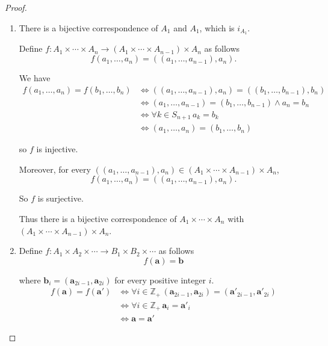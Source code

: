 \begin{proof}
    \begin{enumerate}[label={(\alph*)}]
        \item There is a bijective correspondence of $A_{1}$ and $A_{1}$, which is $i_{A_{1}}$.

              Define $f: A_{1}\times \cdots \times A_{n} \to (A_{1}\times \cdots \times A_{n-1}) \times A_{n}$ as follows
              \[
                  f(a_{1}, \ldots, a_{n}) = ((a_{1}, \ldots, a_{n-1}), a_{n}).
              \]

              We have
              \begin{align*}
                  f(a_{1}, \ldots, a_{n}) = f(b_{1}, \ldots, b_{n}) & \Longleftrightarrow ((a_{1}, \ldots, a_{n-1}), a_{n}) = ((b_{1}, \ldots, b_{n-1}), b_{n})   \\
                                                                    & \Longleftrightarrow (a_{1}, \ldots, a_{n-1}) = (b_{1}, \ldots, b_{n-1}) \land a_{n} = b_{n} \\
                                                                    & \Longleftrightarrow \forall k\in S_{n+1}\, a_{k} = b_{k}                                    \\
                                                                    & \Longleftrightarrow (a_{1}, \ldots, a_{n}) = (b_{1}, \ldots, b_{n})
              \end{align*}

              so $f$ is injective.

              Moreover, for every $((a_{1}, \ldots, a_{n-1}), a_{n})\in (A_{1}\times \cdots \times A_{n-1}) \times A_{n}$,
              \[
                  f(a_{1}, \ldots, a_{n}) = ((a_{1}, \ldots, a_{n-1}), a_{n}).
              \]

              So $f$ is surjective.

              Thus there is a bijective correspondence of $A_{1}\times\cdots\times A_{n}$ with $(A_{1}\times\cdots\times A_{n-1})\times A_{n}$.
        \item Define $f: A_{1}\times A_{2}\times \cdots \to B_{1} \times B_{2} \times\cdots$ as follows
              \[
                  f(\mathbf{a}) = \mathbf{b}
              \]

              where $\mathbf{b}_{i} = (\mathbf{a}_{2i-1}, \mathbf{a}_{2i})$ for every positive integer $i$.
              \begin{align*}
                  f(\mathbf{a}) = f(\mathbf{a}') & \Longleftrightarrow \forall i\in\mathbb{Z}_{+}\, (\mathbf{a}_{2i-1}, \mathbf{a}_{2i}) = (\mathbf{a}'_{2i-1}, \mathbf{a}'_{2i}) \\
                                                 & \Longleftrightarrow \forall i\in\mathbb{Z}_{+}\, \mathbf{a}_{i} = \mathbf{a}'_{i}                                              \\
                                                 & \Longleftrightarrow \mathbf{a} = \mathbf{a}'
              \end{align*}


\end{enumerate}
\end{proof}
